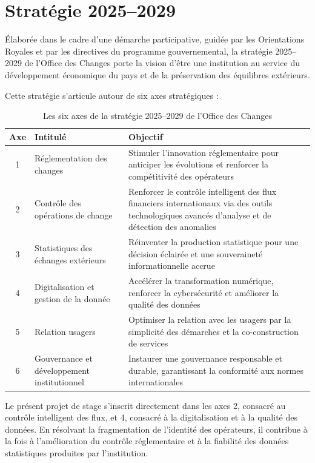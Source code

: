 \section{Stratégie 2025--2029}

Élaborée dans le cadre d'une démarche participative, guidée par les Orientations Royales et par les directives du programme gouvernemental, la stratégie 2025--2029 de l'Office des Changes porte la vision d'être une institution au service du développement économique du pays et de la préservation des équilibres extérieurs.

Cette stratégie s'articule autour de six axes stratégiques :

\begin{table}[H]
\centering
\caption{Les six axes de la stratégie 2025--2029 de l'Office des Changes}
\renewcommand{\arraystretch}{1.4}
\begin{tabular}{|c|p{4cm}|p{8cm}|}
\hline
\textbf{Axe} & \textbf{Intitulé} & \textbf{Objectif} \\
\hline
1 & Réglementation des changes & Stimuler l'innovation réglementaire pour anticiper les évolutions et renforcer la compétitivité des opérateurs \\
\hline
2 & Contrôle des opérations de change & Renforcer le contrôle intelligent des flux financiers internationaux via des outils technologiques avancés d'analyse et de détection des anomalies \\
\hline
3 & Statistiques des échanges extérieurs & Réinventer la production statistique pour une décision éclairée et une souveraineté informationnelle accrue \\
\hline
4 & Digitalisation et gestion de la donnée & Accélérer la transformation numérique, renforcer la cybersécurité et améliorer la qualité des données \\
\hline
5 & Relation usagers & Optimiser la relation avec les usagers par la simplicité des démarches et la co-construction de services \\
\hline
6 & Gouvernance et développement institutionnel & Instaurer une gouvernance responsable et durable, garantissant la conformité aux normes internationales \\
\hline
\end{tabular}
\end{table}

\noindent Le présent projet de stage s'inscrit directement dans les axes 2, consacré au contrôle intelligent des flux, et 4, consacré à la digitalisation et à la qualité des données. En résolvant la fragmentation de l'identité des opérateurs, il contribue à la fois à l'amélioration du contrôle réglementaire et à la fiabilité des données statistiques produites par l'institution.

